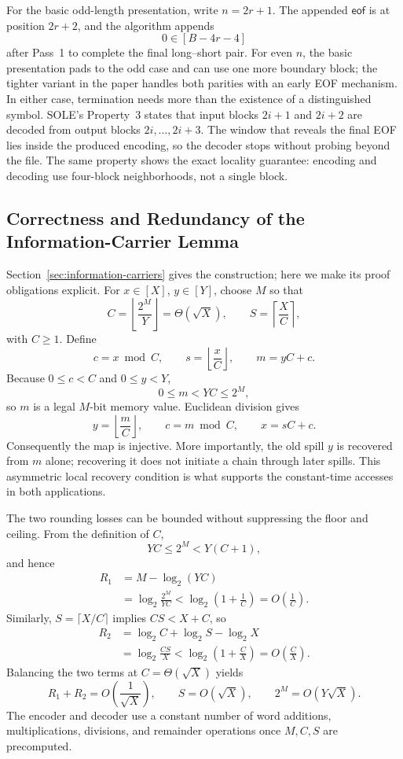 For the basic odd-length presentation, write \(n=2r+1\).  The appended
\(\mathsf{eof}\) is at position \(2r+2\), and the algorithm appends
\[
    0\in[B-4r-4]
\]
after Pass~1 to complete the final long--short pair.  For even \(n\), the
basic presentation pads to the odd case and can use one more boundary block;
the tighter variant in the paper handles both parities with an early EOF
mechanism.  In either case, termination needs more than the existence of a
distinguished symbol.  SOLE's Property~3 states that input blocks \(2i+1\)
and \(2i+2\) are decoded from output blocks \(2i,\ldots,2i+3\).  The window
that reveals the final EOF lies inside the produced encoding, so the decoder
stops without probing beyond the file.  The same property shows the exact
locality guarantee: encoding and decoding use four-block neighborhoods, not a
single block.

\subsection{Correctness and Redundancy of the Information-Carrier Lemma}

Section~\ref{sec:information-carriers} gives the construction; here we make
its proof obligations explicit.  For \(x\in[X]\), \(y\in[Y]\), choose
\(M\) so that
\[
    C=\left\lfloor\frac{2^M}{Y}\right\rfloor
    =\Theta(\sqrt X),
    \qquad
    S=\left\lceil\frac{X}{C}\right\rceil,
\]
with \(C\geq1\).  Define
\[
    c=x\bmod C,
    \qquad
    s=\left\lfloor\frac{x}{C}\right\rfloor,
    \qquad
    m=yC+c.
\]
Because \(0\leq c<C\) and \(0\leq y<Y\),
\[
    0\leq m<YC\leq2^M,
\]
so \(m\) is a legal \(M\)-bit memory value.  Euclidean division gives
\[
    y=\left\lfloor\frac{m}{C}\right\rfloor,
    \qquad
    c=m\bmod C,
    \qquad
    x=sC+c.
\]
Consequently the map is injective.  More importantly, the old spill \(y\) is
recovered from \(m\) alone; recovering it does not initiate a chain through
later spills.  This asymmetric local recovery condition is what supports the
constant-time accesses in both applications.

The two rounding losses can be bounded without suppressing the floor and
ceiling.  From the definition of \(C\),
\[
    YC\leq2^M<Y(C+1),
\]
and hence
\[
\begin{aligned}
    R_1
    &=M-\log_2(YC)\\
    &=\log_2\frac{2^M}{YC}
      <\log_2\left(1+\frac{1}{C}\right)
      =O\left(\frac{1}{C}\right).
\end{aligned}
\]
Similarly, \(S=\lceil X/C\rceil\) implies \(CS<X+C\), so
\[
\begin{aligned}
    R_2
    &=\log_2C+\log_2S-\log_2X\\
    &=\log_2\frac{CS}{X}
      <\log_2\left(1+\frac{C}{X}\right)
      =O\left(\frac{C}{X}\right).
\end{aligned}
\]
Balancing the two terms at \(C=\Theta(\sqrt X)\) yields
\[
    R_1+R_2=O\left(\frac{1}{\sqrt X}\right),
    \qquad
    S=O(\sqrt X),
    \qquad
    2^M=O(Y\sqrt X).
\]
The encoder and decoder use a constant number of word additions,
multiplications, divisions, and remainder operations once \(M,C,S\) are
precomputed.

